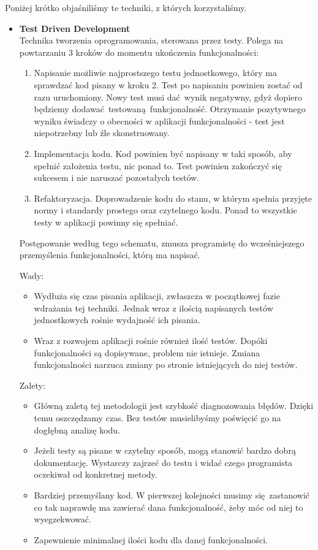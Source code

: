     Poniżej krótko objaśniliśmy te techniki, z których korzystaliśmy.
    \begin{itemize}
      \item \textbf{Test Driven Development}\cite{tdd} \\
        Technika tworzenia oprogramowania, sterowana przez testy. Polega na powtarzaniu 3 kroków do momentu ukończenia funkcjonalności:
        \begin{enumerate}
          \item Napisanie możliwie najprostszego testu jednostkowego, który ma sprawdzać kod pisany w kroku 2. Test po napisaniu powinien zostać od razu uruchomiony. Nowy test musi dać wynik negatywny, gdyż dopiero będziemy dodawać testowaną funkcjonalność. Otrzymanie pozytywnego wyniku świadczy o obecności w aplikacji funkcjonalności - test jest niepotrzebny lub źle skonstruowany.
          \item Implementacja kodu. Kod powinien być napisany w taki sposób, aby spełnić założenia testu, nic ponad to. Test powinien zakończyć się sukcesem i nie naruszać pozostałych testów.
          \item Refaktoryzacja. Doprowadzenie kodu do stanu, w którym spełnia przyjęte normy i standardy prostego oraz czytelnego kodu\cite{scs}. Ponad to wszystkie testy w aplikacji powinny się spełniać.
        \end{enumerate}

        Postępowanie według tego schematu, zmusza programistę do wcześniejszego przemyślenia funkcjonalności, którą ma napisać.

        Wady:
        \begin{itemize}
          \item Wydłuża się czas pisania aplikacji, zwłaszcza w początkowej fazie wdrażania tej techniki. Jednak wraz z ilością napisanych testów jednostkowych rośnie wydajność ich pisania.
          \item Wraz z rozwojem aplikacji rośnie również ilość testów. Dopóki funkcjonalności są dopisywane, problem nie istnieje. Zmiana funkcjonalności narzuca zmiany po stronie istniejących do niej testów.
        \end{itemize}
        \newpage

        Zalety:
        \begin{itemize}
          \item Główną zaletą tej metodologii jest szybkość diagnozowania błędów. Dzięki temu oszczędzamy czas. Bez testów musielibyśmy poświęcić go na dogłębną analizę kodu.
          \item Jeżeli testy są pisane w czytelny sposób, mogą stanowić bardzo dobrą dokumentację. Wystarczy zajrzeć do testu i widać czego programista oczekiwał od konkretnej metody.
          \item Bardziej przemyślany kod. W pierwszej kolejności musimy się zastanowić co tak naprawdę ma zawierać dana funkcjonalność, żeby móc od niej to wyegzekwować.
          \item Zapewnienie minimalnej ilości kodu dla danej funkcjonalności.
        \end{itemize}


\end{itemize}

